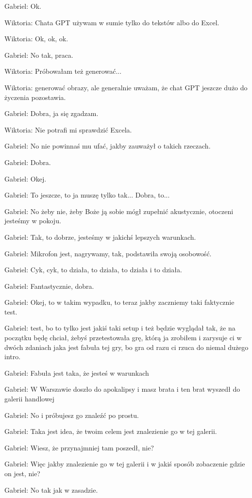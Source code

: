 Gabriel: Ok.

Wiktoria: Chata GPT używam w sumie tylko do tekstów albo do Excel.

Wiktoria: Ok, ok, ok.

Gabriel: No tak, praca.

Wiktoria: Próbowałam też generować...

Wiktoria: generować obrazy, ale generalnie uważam, że chat GPT jeszcze dużo do życzenia pozostawia.

Gabriel: Dobra, ja się zgadzam.

Wiktoria: Nie potrafi mi sprawdzić Excela.

Gabriel: No nie powinnaś mu ufać, jakby zauważył o takich rzeczach.

Gabriel: Dobra.

Gabriel: Okej.

Gabriel: To jeszcze, to ja muszę tylko tak... Dobra, to...

Gabriel: No żeby nie, żeby Boże ją sobie mógł zupełnić akustycznie, otoczeni jesteśmy w pokoju.

Gabriel: Tak, to dobrze, jesteśmy w jakichś lepszych warunkach.

Gabriel: Mikrofon jest, nagrywamy, tak, podstawiła swoją osobowość.

Gabriel: Cyk, cyk, to działa, to działa, to działa i to działa.

Gabriel: Fantastycznie, dobra.

Gabriel: Okej, to w takim wypadku, to teraz jakby zaczniemy taki faktycznie test.

Gabriel: test, bo to tylko jest jakiś taki setup i też będzie wyglądał tak, że na początku będę chciał, żebyś przetestowała grę, którą ja zrobiłem i zarysuje ci w dwóch zdaniach jaka jest fabuła tej gry, bo gra od razu ci rzuca do niemal dużego intro.

Gabriel: Fabuła jest taka, że jesteś w warunkach

Gabriel: W Warszawie doszło do apokalipsy i masz brata i ten brat wyszedł do galerii handlowej

Gabriel: No i próbujesz go znaleźć po prostu.

Gabriel: Taka jest idea, że twoim celem jest znalezienie go w tej galerii.

Gabriel: Wiesz, że przynajmniej tam poszedł, nie?

Gabriel: Więc jakby znalezienie go w tej galerii i w jakiś sposób zobaczenie gdzie on jest, nie?

Gabriel: No tak jak w zasadzie.

